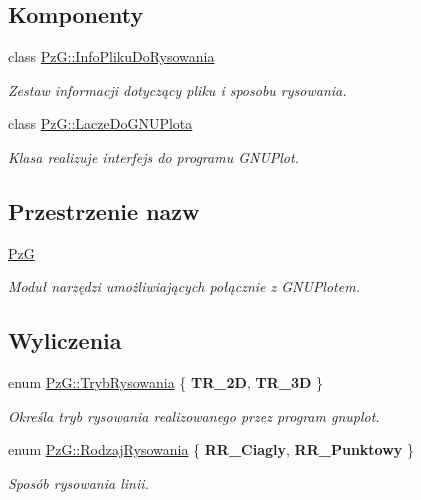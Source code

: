 \subsection*{Komponenty}
\begin{DoxyCompactItemize}
\item 
class \hyperlink{classPzG_1_1InfoPlikuDoRysowania}{Pz\+G\+::\+Info\+Pliku\+Do\+Rysowania}
\begin{DoxyCompactList}\small\item\em Zestaw informacji dotyczący pliku i sposobu rysowania. \end{DoxyCompactList}\item 
class \hyperlink{classPzG_1_1LaczeDoGNUPlota}{Pz\+G\+::\+Lacze\+Do\+G\+N\+U\+Plota}
\begin{DoxyCompactList}\small\item\em Klasa realizuje interfejs do programu G\+N\+U\+Plot. \end{DoxyCompactList}\end{DoxyCompactItemize}
\subsection*{Przestrzenie nazw}
\begin{DoxyCompactItemize}
\item 
 \hyperlink{namespacePzG}{PzG}
\begin{DoxyCompactList}\small\item\em Moduł narzędzi umożliwiających połącznie z G\+N\+U\+Plotem. \end{DoxyCompactList}\end{DoxyCompactItemize}
\subsection*{Wyliczenia}
\begin{DoxyCompactItemize}
\item 
enum \hyperlink{namespacePzG_aeedae1ef10c66d720f9e89de408ca4ca}{Pz\+G\+::\+Tryb\+Rysowania} \{ {\bfseries T\+R\+\_\+2D}, 
{\bfseries T\+R\+\_\+3D}
 \}\begin{DoxyCompactList}\small\item\em Określa tryb rysowania realizowanego przez program {\ttfamily gnuplot}. \end{DoxyCompactList}
\item 
enum \hyperlink{namespacePzG_a705c92106f39b7d0c34a6739d10ff0b6}{Pz\+G\+::\+Rodzaj\+Rysowania} \{ {\bfseries R\+R\+\_\+\+Ciagly}, 
{\bfseries R\+R\+\_\+\+Punktowy}
 \}\begin{DoxyCompactList}\small\item\em Sposób rysowania linii. \end{DoxyCompactList}
\end{DoxyCompactItemize}


